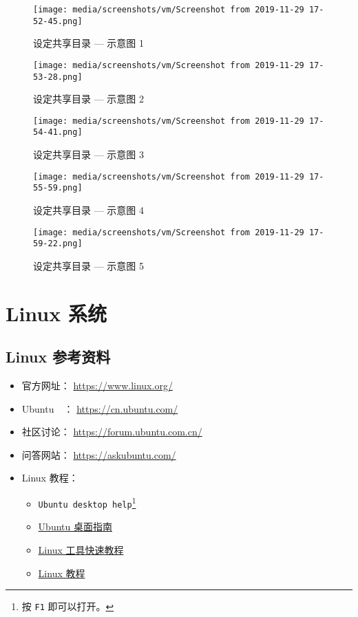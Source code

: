 \documentclass[
    11pt,
    cite=authoryear,
    device=phone,
    lang=cn,
    mode=simple,
    result=answer,
    toc=onecol,
]{elegantbook_sierxue}
\begin{document}
\begin{figure}[!htbp]
  \centering
  \texttt{[image: media/screenshots/vm/Screenshot from 2019-11-29 17-52-45.png]}
  \caption{设定共享目录 --- 示意图 1}
\end{figure}
\begin{figure}[!htbp]
  \centering
  \texttt{[image: media/screenshots/vm/Screenshot from 2019-11-29 17-53-28.png]}
  \caption{设定共享目录 --- 示意图 2}
\end{figure}
\begin{figure}[!htbp]
  \centering
  \texttt{[image: media/screenshots/vm/Screenshot from 2019-11-29 17-54-41.png]}
  \caption{设定共享目录 --- 示意图 3}
\end{figure}
\begin{figure}[!htbp]
  \centering
  \texttt{[image: media/screenshots/vm/Screenshot from 2019-11-29 17-55-59.png]}
  \caption{设定共享目录 --- 示意图 4}
\end{figure}
\begin{figure}[!htbp]
  \centering
  \texttt{[image: media/screenshots/vm/Screenshot from 2019-11-29 17-59-22.png]}
  \caption{设定共享目录 --- 示意图 5}
\end{figure}

\section{Linux 系统}%
\label{sec:linux-a}

\subsection{Linux 参考资料}%
\label{sub:linux-refs}

\begin{itemize}
    \item 官方网址： \href{https://www.linux.org/}{https://www.linux.org/}
    \item Ubuntu~~： \href{https://cn.ubuntu.com/}{https://cn.ubuntu.com/}
    \item 社区讨论：
        \href{https://forum.ubuntu.com.cn/}{https://forum.ubuntu.com.cn/}
    \item 问答网站：
        \href{https://askubuntu.com/}{https://askubuntu.com/}
    \item Linux 教程：
        \begin{itemize}
            \item \lstinline{Ubuntu desktop help}\footnote{
                按 \lstinline{F1} 即可以打开。}
            \item \href{https://help.ubuntu.com/lts/ubuntu-help/index.html}
                {Ubuntu 桌面指南}
            \item \href{https://linuxtools-rst.readthedocs.io/zh_CN/latest/}
                {Linux 工具快速教程}
            \item \href{https://dunwu.github.io/linux-tutorial/#/}
                {Linux 教程}
        \end{itemize}
\end{itemize}
\end{document}
